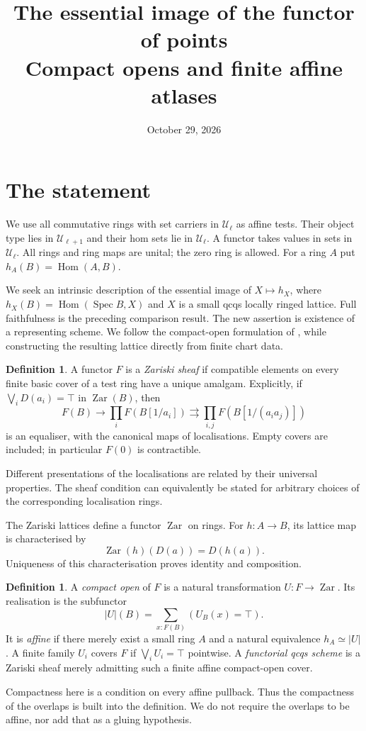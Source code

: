 \documentclass[11pt]{amsart}
\title[The essential image of the functor of points]{The essential image of the functor of points\\Compact opens and finite affine atlases}
\date{October 29, 2026}
\theoremstyle{definition}\newtheorem{definition}[theorem]{Definition}
\theoremstyle{remark}\newtheorem{remark}[theorem]{Remark}
\newcommand{\UU}{\mathcal U}
\newcommand{\Hom}{\operatorname{Hom}}
\newcommand{\Spec}{\operatorname{Spec}}
\newcommand{\Zar}{\operatorname{Zar}}
\begin{document}
\raggedbottom\maketitle

\section{The statement}
We use all commutative rings with set carriers in $\UU_\ell$ as affine
tests. Their object type lies in $\UU_{\ell+1}$ and their hom sets lie
in $\UU_\ell$. A functor takes values in sets in $\UU_\ell$.
All rings and ring maps are unital; the zero ring is allowed.
For a ring $A$ put $h_A(B)=\Hom(A,B)$.

We seek an intrinsic description of the essential image of
$X\mapsto h_X$, where $h_X(B)=\Hom(\Spec B,X)$ and $X$ is a small qcqs
locally ringed lattice. Full faithfulness is the preceding comparison
result. The new assertion is existence of a representing scheme.
We follow the compact-open formulation of \cite{Zeuner,ZH}, while
constructing the resulting lattice directly from finite chart data.

\begin{definition}
A functor $F$ is a \emph{Zariski sheaf} if compatible elements on every
finite basic cover of a test ring have a unique amalgam. Explicitly, if
$\bigvee_i D(a_i)=\top$ in $\Zar(B)$, then
\[
 F(B)\longrightarrow\prod_i F(B[1/a_i])
 \rightrightarrows\prod_{i,j}F(B[1/(a_i a_j)])
\]
is an equaliser, with the canonical maps of localisations. Empty covers
are included; in particular $F(0)$ is contractible.
\end{definition}
Different presentations of the localisations are related by their
universal properties. The sheaf condition can equivalently be stated
for arbitrary choices of the corresponding localisation rings.

The Zariski lattices define a functor $\Zar$ on rings. For $h:A\to B$,
its lattice map is characterised by
\[
 \Zar(h)(D(a))=D(h(a)).
\]
Uniqueness of this characterisation proves identity and composition.

\begin{definition}
A \emph{compact open} of $F$ is a natural transformation $U:F\to\Zar$.
Its realisation is the subfunctor
\[
 |U|(B)=\sum_{x:F(B)}(U_B(x)=\top).
\]
It is \emph{affine} if there merely exist a small ring $A$ and a natural
equivalence $h_A\simeq |U|$. A finite family $U_i$ covers $F$ if
$\bigvee_i U_i=\top$ pointwise. A \emph{functorial qcqs scheme} is a
Zariski sheaf merely admitting such a finite affine compact-open cover.
\end{definition}
Compactness here is a condition on every affine pullback. Thus the
compactness of the overlaps is built into the definition. We do not
require the overlaps to be affine, nor add that as a gluing hypothesis.
\end{document}

